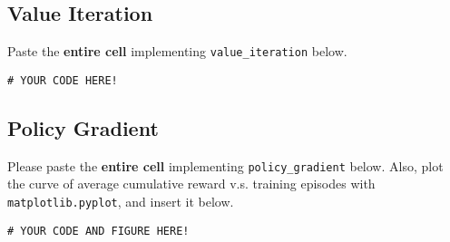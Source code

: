 \documentclass[12pt]{article}
\begin{document}
\subsection*{Value Iteration}
Paste the \textbf{entire cell}  implementing \texttt{value\_iteration} below.
\begin{solution}
    \begin{verbatim}
# YOUR CODE HERE!
    \end{verbatim}
\end{solution}
\subsection*{Policy Gradient}
Please paste the \textbf{entire cell}  implementing \texttt{policy\_gradient}  below. Also, plot the curve of average cumulative reward v.s. training episodes with \texttt{matplotlib.pyplot}, and insert it below. 
\begin{solution}
    \begin{verbatim}
# YOUR CODE AND FIGURE HERE!
    \end{verbatim}
\end{solution}
\end{document}
